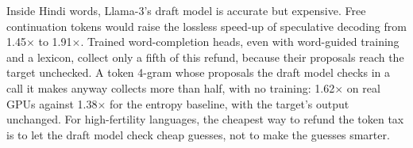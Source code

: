 \documentclass[11pt]{article}
\newcommand{\x}{$\times$}
\begin{document}
Inside Hindi words, Llama-3's draft model is accurate but expensive. Free continuation tokens would
raise the lossless speed-up of speculative decoding from 1.45\x{} to 1.91\x. Trained word-completion
heads, even with word-guided training and a lexicon, collect only a fifth of this refund, because
their proposals reach the target unchecked. A token 4-gram whose proposals the draft model checks in a
call it makes anyway collects more than half, with no training: 1.62\x{} on real GPUs against 1.38\x{}
for the entropy baseline, with the target's output unchanged. For high-fertility languages, the cheapest
way to refund the token tax is to let the draft model check cheap guesses, not to make the guesses smarter.



\end{document}
